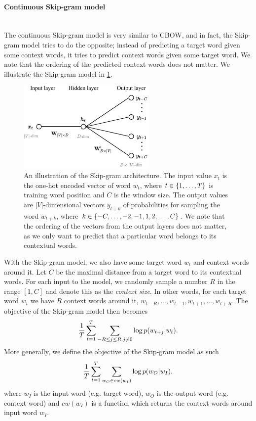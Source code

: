 \paragraph*{Continuous Skip-gram model}\mbox{} \\
The continuous Skip-gram model is very similar to CBOW, and in fact, the Skip-gram model tries to do the opposite; instead of predicting a target word given some context words, it tries to predict context words given some target word. We note that the ordering of the predicted context words does not matter. We illustrate the Skip-gram model in \cref{fig:skip-gram-model}.
\begin{figure}[H]
    \centering
    \includegraphics[width=0.6\textwidth]{thesis/figures/skim-gram_cropped.pdf}
    \caption{An illustration of the Skip-gram architecture. The input value $x_t$ is the one-hot encoded vector of word $w_t$, where $t \in \left\{1, \ldots, T\right\}$ is training word position and $C$ is the window size. The output values are $|V|$-dimensional vectors $y_{t+k}$ of probabilities for sampling the word $w_{t+k}$, where $k \in \left\{-C, \ldots, -2, -1, 1, 2, \ldots, C\right\}$. We note that the ordering of the vectors from the output layers does not matter, as we only want to predict that a particular word belongs to its contextual words.}
    \label{fig:skip-gram-model}
\end{figure}

With the Skip-gram model, we also have some target word $w_t$ and context words around it. Let $C$ be the maximal distance from a target word to its contextual words. For each input to the model, we randomly sample a number $R$ in the range $[1, C]$ and denote this as the \textit{context size}. In other words, for each target word $w_t$ we have $R$ context words around it, $w_{t-R}, \ldots, w_{t-1}, w_{t+1}, \ldots, w_{t+R}$. The objective of the Skip-gram model then becomes
\begin{align}
    \frac{1}{T} \sum\limits_{t=1}^{T} \sum\limits_{-R \leq j \leq R, j \neq 0}^{} \log p(w_{t+j} | w_t).
    \label{eqn:skip-gram-objective-function}
\end{align}
More generally, we define the objective of the Skip-gram model as such
\begin{align}
    \frac{1}{T} \sum\limits_{t=1}^{T} \sum\limits_{w_O \in cw(w_I)}^{} \log p(w_O | w_I),
    \label{eqn:skip-gram-objective-function-general}
\end{align}
where $w_I$ is the input word (e.g. target word), $w_O$ is the output word (e.g. context word) and $cw(w_I)$ is a function which returns the context words around input word $w_I$.

